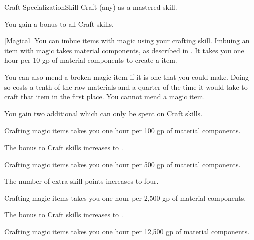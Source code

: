     \begin{feat}{Craft Specialization}{Skill}
        \featpre Craft (any) as a mastered skill.
        \featben

         You gain a  bonus to all Craft skills.

        [Magical] You can imbue items with magic using your crafting skill.
        Imbuing an item with magic takes material components, as described in .
        It takes you one hour per 10 gp of material components to create a item.

        You can also mend a broken magic item if it is one that you could make.
        Doing so costs a tenth of the raw materials and a quarter of the time it would take to craft that item in the first place.
        You cannot mend a  magic item.

         You gain two additional  which can only be spent on Craft skills.

         Crafting magic items takes you one hour per 100 gp of material components.

         The bonus to Craft skills increases to .

         Crafting magic items takes you one hour per 500 gp of material components.

         The number of extra skill points increases to four.

         Crafting magic items takes you one hour per 2,500 gp of material components.

         The bonus to Craft skills increases to .

         Crafting magic items takes you one hour per 12,500 gp of material components.
    \end{feat}

